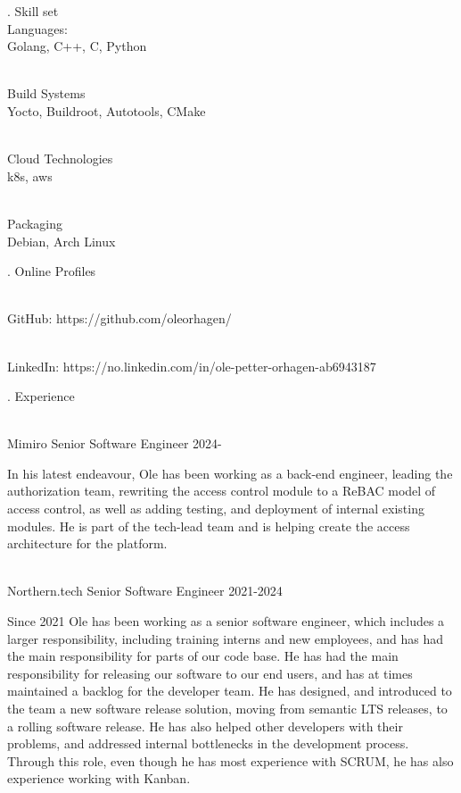 \finishpage

. {Skill set}
\\ Languages:
\\ \star Golang, C++, C, Python

\\ Build Systems
\\ \star Yocto, Buildroot, Autotools, CMake

\\ Cloud Technologies
\\ \star k8s, aws

\\ Packaging
\\ \star Debian, Arch Linux

. {Online Profiles}

\\ \star GitHub: https://github.com/oleorhagen/

\\ \star LinkedIn: https://no.linkedin.com/in/ole-petter-orhagen-ab6943187

. {Experience}


\\ \star Mimiro Senior Software Engineer 2024-

In his latest endeavour, Ole has been working as a back-end engineer, leading the
authorization team, rewriting the access control module to a ReBAC model of
access control, as well as adding testing, and deployment of internal existing
modules. He is part of the tech-lead team and is helping create the access
architecture for the platform.

\\ \star Northern.tech Senior Software Engineer 2021-2024

Since 2021 Ole has been working as a senior software engineer, which includes a
larger responsibility, including training interns and new employees, and has had
the main responsibility for parts of our code base. He has had the main
responsibility for releasing our software to our end users, and has at times
maintained a backlog for the developer team. He has designed, and introduced to
the team a new software release solution, moving from semantic LTS releases, to
a rolling software release. He has also helped other developers with their
problems, and addressed internal bottlenecks in the development process. Through
this role, even though he has most experience with SCRUM, he has also experience
working with Kanban.

